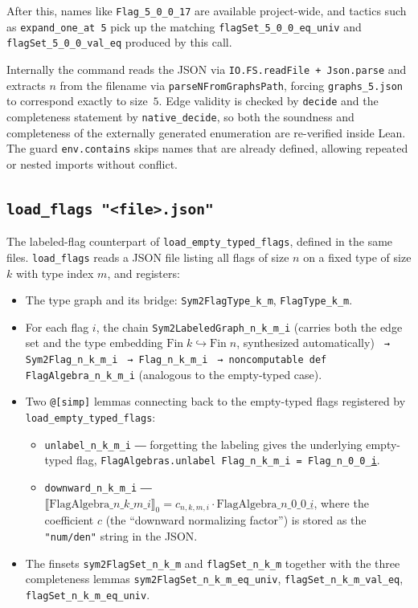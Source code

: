 \documentclass[11pt]{article}
\begin{document}
After this, names like \texttt{Flag\_5\_0\_0\_17} are available
project-wide, and tactics such as \texttt{expand\_one\_at 5} pick up
the matching \texttt{flagSet\_5\_0\_0\_eq\_univ} and
\texttt{flagSet\_5\_0\_0\_val\_eq} produced by this call.

Internally the command reads the JSON via
\texttt{IO.FS.readFile + Json.parse} and extracts $n$ from the
filename via \texttt{parseNFromGraphsPath}, forcing
\texttt{graphs\_5.json} to correspond exactly to size~$5$. Edge
validity is checked by \texttt{decide} and the completeness statement
by \texttt{native\_decide}, so both the soundness and completeness of
the externally generated enumeration are re-verified inside Lean. The
guard \texttt{env.contains} skips names that are already defined,
allowing repeated or nested imports without conflict.

\subsection{\texttt{load\_flags "<file>.json"}}

The labeled-flag counterpart of \texttt{load\_empty\_typed\_flags},
defined in the same files. \texttt{load\_flags} reads a JSON file
listing all flags of size $n$ on a fixed type of size $k$ with type
index $m$, and registers:

\begin{itemize}
  \item The type graph and its bridge:
    \texttt{Sym2FlagType\_k\_m}, \texttt{FlagType\_k\_m}.
  \item For each flag $i$, the chain
    \texttt{Sym2LabeledGraph\_n\_k\_m\_i} (carries both the edge set
    and the type embedding $\mathrm{Fin}\;k \hookrightarrow
    \mathrm{Fin}\;n$, synthesized automatically)
    \texttt{ → Sym2Flag\_n\_k\_m\_i}
    \texttt{ → Flag\_n\_k\_m\_i}
    \texttt{ → noncomputable def FlagAlgebra\_n\_k\_m\_i}
    (analogous to the empty-typed case).
  \item Two \texttt{@[simp]} lemmas connecting back to the
    empty-typed flags registered by \texttt{load\_empty\_typed\_flags}:
    \begin{itemize}
      \item \texttt{unlabel\_n\_k\_m\_i} ― forgetting the labeling
        gives the underlying empty-typed flag,
        \texttt{FlagAlgebras.unlabel Flag\_n\_k\_m\_i =
        Flag\_n\_0\_0\_{\underline i}}.
      \item \texttt{downward\_n\_k\_m\_i} ―
        $\llbracket \mathrm{FlagAlgebra}\_n\_k\_m\_i \rrbracket_0
        = c_{n,k,m,i}\cdot
        \mathrm{FlagAlgebra}\_n\_0\_0\_{\underline i}$, where the
        coefficient $c$ (the ``downward normalizing factor'') is
        stored as the \texttt{"num/den"} string in the JSON.
    \end{itemize}
  \item The finsets \texttt{sym2FlagSet\_n\_k\_m} and
    \texttt{flagSet\_n\_k\_m} together with the three completeness
    lemmas
    \texttt{sym2FlagSet\_n\_k\_m\_eq\_univ},
    \texttt{flagSet\_n\_k\_m\_val\_eq},
    \texttt{flagSet\_n\_k\_m\_eq\_univ}.
\end{itemize}
\end{document}
